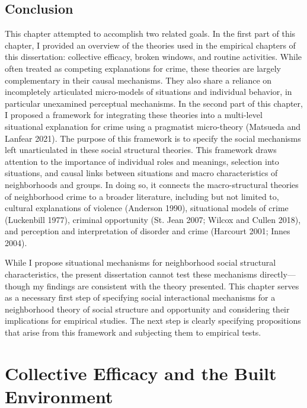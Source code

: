 \documentclass [11pt, proquest] {uwthesis}[2015/03/03]
\begin{document}
\hypertarget{conclusion}{%
\section{Conclusion}\label{conclusion}}

This chapter attempted to accomplish two related goals. In the first part of this chapter, I provided an overview of the theories used in the empirical chapters of this dissertation: collective efficacy, broken windows, and routine activities. While often treated as competing explanations for crime, these theories are largely complementary in their causal mechanisms. They also share a reliance on incompletely articulated micro-models of situations and individual behavior, in particular unexamined perceptual mechanisms. In the second part of this chapter, I proposed a framework for integrating these theories into a multi-level situational explanation for crime using a pragmatist micro-theory (Matsueda and Lanfear 2021). The purpose of this framework is to specify the social mechanisms left unarticulated in these social structural theories. This framework draws attention to the importance of individual roles and meanings, selection into situations, and causal links between situations and macro characteristics of neighborhoods and groups. In doing so, it connects the macro-structural theories of neighborhood crime to a broader literature, including but not limited to, cultural explanations of violence (Anderson 1990), situational models of crime (Luckenbill 1977), criminal opportunity (St. Jean 2007; Wilcox and Cullen 2018), and perception and interpretation of disorder and crime (Harcourt 2001; Innes 2004).

While I propose situational mechanisms for neighborhood social structural characteristics, the present dissertation cannot test these mechanisms directly---though my findings are consistent with the theory presented. This chapter serves as a necessary first step of specifying social interactional mechanisms for a neighborhood theory of social structure and opportunity and considering their implications for empirical studies. The next step is clearly specifying propositions that arise from this framework and subjecting them to empirical tests.

\hypertarget{builtenvironment}{%
\chapter{Collective Efficacy and the Built Environment}\label{builtenvironment}}
\end{document}
